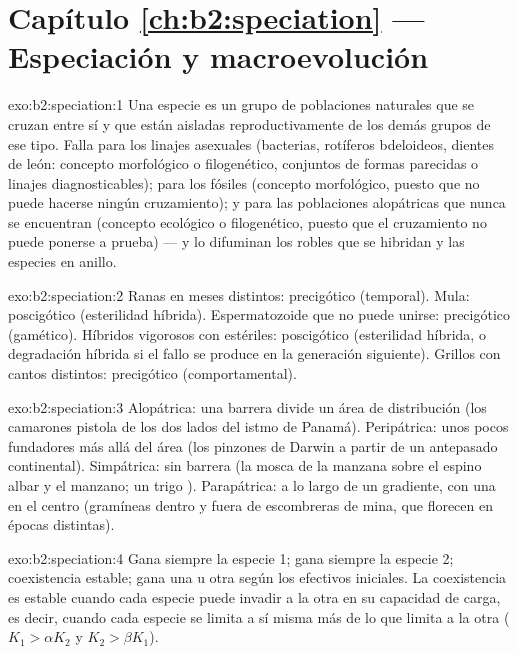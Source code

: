 \section*{Capítulo \ref{ch:b2:speciation} --- Especiación y macroevolución}

\begin{solution}{exo:b2:speciation:1}
Una especie es un grupo de poblaciones naturales que se cruzan entre sí y
que están aisladas reproductivamente de los demás grupos de ese tipo.
Falla para los linajes asexuales (bacterias, rotíferos bdeloideos, dientes
de león: concepto morfológico o filogenético, conjuntos de formas
parecidas o linajes diagnosticables); para los fósiles (concepto
morfológico, puesto que no puede hacerse ningún cruzamiento); y para las
poblaciones alopátricas que nunca se encuentran (concepto ecológico o
filogenético, puesto que el cruzamiento no puede ponerse a prueba) --- y lo
difuminan los robles que se hibridan y las especies en anillo.
\end{solution}

\begin{solution}{exo:b2:speciation:2}
Ranas en meses distintos: precigótico (temporal). Mula: poscigótico
(esterilidad híbrida). Espermatozoide que no puede unirse: precigótico
(gamético). Híbridos vigorosos con  estériles: poscigótico
(esterilidad híbrida, o degradación híbrida si el fallo se produce en la
generación siguiente). Grillos con cantos distintos: precigótico
(comportamental).
\end{solution}

\begin{solution}{exo:b2:speciation:3}
Alopátrica: una barrera divide un área de distribución (los camarones
pistola de los dos lados del istmo de Panamá). Peripátrica: unos pocos
fundadores más allá del área (los pinzones de Darwin a partir de un
antepasado continental). Simpátrica: sin barrera (la mosca de la manzana
sobre el espino albar y el manzano; un trigo ). Parapátrica:
a lo largo de un gradiente, con una  en el centro (gramíneas
dentro y fuera de escombreras de mina, que florecen en épocas distintas).
\end{solution}

\begin{solution}{exo:b2:speciation:4}
Gana siempre la especie 1; gana siempre la especie 2; coexistencia
estable; gana una u otra según los efectivos iniciales. La coexistencia es
estable cuando cada especie puede invadir a la otra en su capacidad de
carga, es decir, cuando cada especie se limita a sí misma más de lo que
limita a la otra ($K_1 > \alpha K_2$ y $K_2 > \beta K_1$).
\end{solution}

